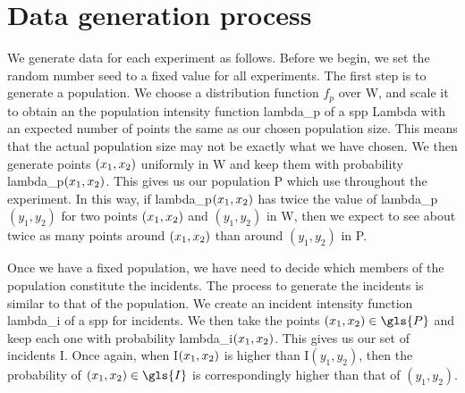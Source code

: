 \section{Data generation process}
\label{sec:theory:data generation}

We generate data for each experiment as follows.
Before we begin, we set the random number seed to a fixed value for all experiments.
The first step is to generate a population.
We choose a distribution function $f_p$ over \gls{W}, and scale it to obtain an the population intensity function \gls{lambda_p} of a \gls{spp} \gls{Lambda} with an expected number of points the same as our chosen population size.
This means that the actual population size may not be exactly what we have chosen.
We then generate points $(x_1, x_2)$ uniformly in \gls{W} and keep them with probability \gls{lambda_p}$(x_1, x_2)$.
This gives us our population \gls{P} which use throughout the experiment.
In this way,
if \gls{lambda_p}$(x_1, x_2)$ has twice the value of \gls{lambda_p}$(y_1, y_2)$ for two points $(x_1, x_2)$ and $(y_1, y_2)$ in \gls{W},
then we expect to see about twice as many points around $(x_1, x_2)$ than around $(y_1, y_2)$ in \gls{P}.

Once we have a fixed population, we have need to decide which members of the population constitute the incidents.
The process to generate the incidents is similar to that of the population.
We create an incident intensity function \gls{lambda_i} of a \gls{spp} for incidents.
We then take the points $\xvec \in \gls{P}$ and keep each one with probability \gls{lambda_i}$(x_1, x_2)$.
This gives us our set of incidents \gls{I}.
Once again, when \gls{I}$(x_1, x_2)$ is higher than \gls{I}$(y_1, y_2)$,
then the probability of $\xvec \in \gls{I}$ is correspondingly higher than that of $(y_1, y_2)$.